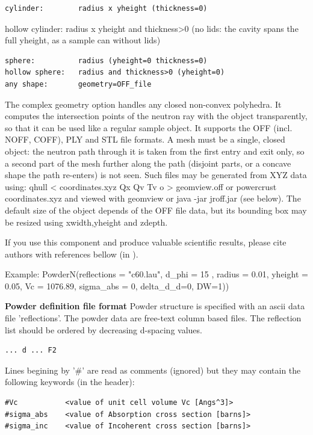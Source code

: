 \begin{verbatim}
cylinder:        radius x yheight (thickness=0)
\end{verbatim}

hollow cylinder: radius x yheight and thickness\textgreater{}0 (no lids: the cavity spans the full yheight, as a sample can without lids)

\begin{verbatim}
sphere:          radius (yheight=0 thickness=0)
hollow sphere:   radius and thickness>0 (yheight=0)
any shape:       geometry=OFF_file
\end{verbatim}

The complex geometry option handles any closed non-convex polyhedra. It computes the intersection points of the neutron ray with the object transparently, so that it can be used like a regular sample object. It supports the OFF (incl. NOFF, COFF), PLY and STL file formats. A mesh must be a single, closed object: the neutron path through it is taken from the first entry and exit only, so a second part of the mesh further along the path (disjoint parts, or a concave shape the path re-enters) is not seen. Such files may be generated from XYZ data using: qhull \textless{} coordinates.xyz Qx Qv Tv o \textgreater{} geomview.off or powercrust coordinates.xyz and viewed with geomview or java -jar jroff.jar (see below). The default size of the object depends of the OFF file data, but its bounding box may be resized using xwidth,yheight and zdepth.

If you use this component and produce valuable scientific results, please cite authors with references bellow (in ).

Example: PowderN(reflections = "c60.lau", d\_phi = 15 , radius = 0.01, yheight = 0.05, Vc = 1076.89, sigma\_abs = 0, delta\_d\_d=0, DW=1))

\textbf{Powder definition file format} Powder structure is specified with an ascii data file 'reflections'. The powder data are free-text column based files. The reflection list should be ordered by decreasing d-spacing values.

\begin{verbatim}
... d ... F2
\end{verbatim}

Lines begining by '\#' are read as comments (ignored) but they may contain the following keywords (in the header):

\begin{verbatim}
#Vc           <value of unit cell volume Vc [Angs^3]>
#sigma_abs    <value of Absorption cross section [barns]>
#sigma_inc    <value of Incoherent cross section [barns]>
\end{verbatim}

